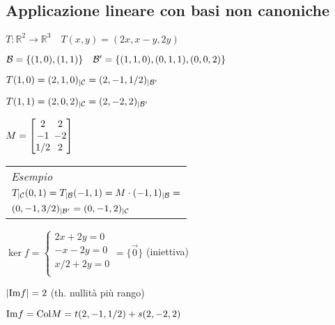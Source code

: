 \subsection{Applicazione lineare con basi non canoniche}
$T: \mathbb{R}^2 \rightarrow \mathbb{R}^3 \quad T(x,y) = (2x, x-y, 2y)$

$\mathcal{B}=\{(1,0), (1,1)\} \quad \mathcal{B}'=\{(1,1,0),(0,1,1),(0,0,2)\}$

$T(1,0) = (2, 1, 0)_{|\mathcal{C}} = (2, -1, 1/2)_{|\mathcal{B}'}$

$T(1,1) = (2, 0, 2)_{|\mathcal{C}} = (2, -2, 2)_{|\mathcal{B}'}$

$
M = \left[
	\arraycolsep=2.0pt\def\arraystretch{1.0}
	\begin{array}{@{}cc@{}}
		2 & 2 \\
		-1 & -2 \\
		1/2 & 2 \\
	\end{array}
\right]
$
\begin{tabular}{l}
	\emph{Esempio} \\
	$T_{|\mathcal{C}}(0,1) = T_{|\mathcal{B}}(-1,1) = M \cdot (-1,1)_{|\mathcal{B}} =$ \\
	$(0,-1,3/2)_{|\mathcal{B}'} = (0,-1,2)_{|\mathcal{C}}$ \\
\end{tabular}

$\ker f = \begin{cases}
2x+2y = 0 \\[-0.3em]
-x-2y = 0 \\[-0.3em]
x/2+2y = 0 \\
\end{cases} = \{\vec{0}\}$ (iniettiva)

$|\mathrm{Im} f| = 2$ (th. nullità più rango)

$\mathrm{Im} f = \mathrm{Col} M = t (2, -1, 1/2) + s (2, -2, 2)$
